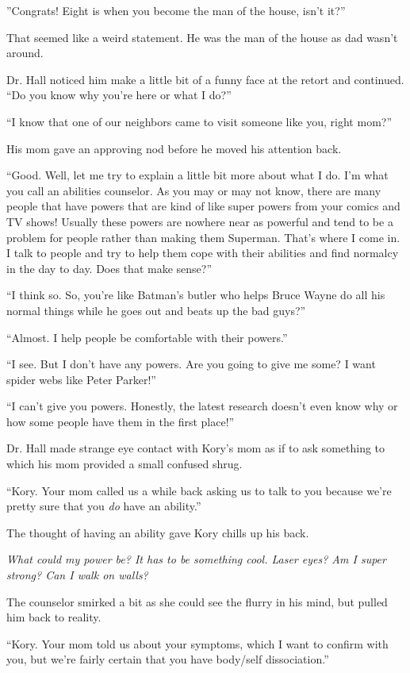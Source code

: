 \documentclass[9pt]{memoir}
\begin{document}
''Congrats! Eight is when you become the man of the house, isn't it?''

That seemed like a weird statement. He was the man of the house as dad wasn't around.

Dr. Hall noticed him make a little bit of a funny face at the retort and continued. ``Do you know why you're here or what I do?''

``I know that one of our neighbors came to visit someone like you, right mom?''

His mom gave an approving nod before he moved his attention back.

``Good. Well, let me try to explain a little bit more about what I do. I'm what you call an abilities counselor. As you may or may not know, there are many people that have powers that are kind of like super powers from your comics and TV shows! Usually these powers are nowhere near as powerful and tend to be a problem for people rather than making them Superman. That's where I come in. I talk to people and try to help them cope with their abilities and find normalcy in the day to day. Does that make sense?''

``I think so. So, you're like Batman's butler who helps Bruce Wayne do all his normal things while he goes out and beats up the bad guys?''

``Almost. I help people be comfortable with their powers.''

``I see. But I don't have any powers. Are you going to give me some? I want spider webs like Peter Parker!''

``I can't give you powers. Honestly, the latest research doesn't even know why or how some people have them in the first place!''

Dr. Hall made strange eye contact with Kory's mom as if to ask something to which his mom provided a small confused shrug.

``Kory. Your mom called us a while back asking us to talk to you because we're pretty sure that you \textit{do} have an ability.''

The thought of having an ability gave Kory chills up his back.

\textit{What could my power be? It has to be something cool. Laser eyes? Am I super strong? Can I walk on walls?}

The counselor smirked a bit as she could see the flurry in his mind, but pulled him back to reality.

``Kory. Your mom told us about your symptoms, which I want to confirm with you, but we're fairly certain that you have body/self dissociation.''
\end{document}
